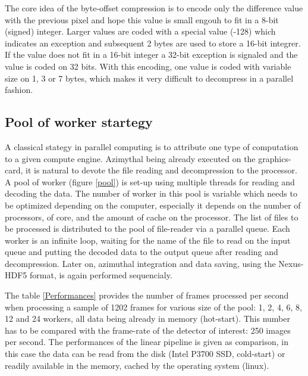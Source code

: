 \documentclass[preprint, pdf]{iucr}              %
\begin{document}
The core idea of the byte-offset compression is to encode only the difference
value with the previous pixel and hope this value is small engouh to fit in a
8-bit (signed) integer. 
Larger values are coded with a special value (-128) which indicates an exception
and subsequent 2 bytes are used to store a 16-bit integrer. 
If the value does not fit in a 16-bit integer a 32-bit exception is signaled and
the value is coded on 32 bits. 
With this encoding, one value is coded with variable size on 1, 3 or 7 bytes,
which makes it very difficult to decompress in a parallel fashion. 

\subsection{Pool of worker startegy} 

A classical stategy in parallel computing is to attribute one type of
computation to a given compute engine.
Azimythal being already executed on the graphics-card, it is natural to devote
the file reading and decompression to the processor.
A pool of worker (figure \ref{pool}) is set-up using multiple threads for
reading and decoding the data. 
The number of worker in this pool is variable which needs to be optimized 
depending on the computer, especially it depends on the number of processors,
of core, and the amount of cache on the processor.
The list of files to be processed is distributed to the pool of file-reader via
a parallel queue.
Each worker is an infinite loop, waiting for the name of the file to read 
on the input queue and putting the decoded data to the output queue after
reading and decompression.
Later on, azimuthal integration and data saving, using the Nexus-HDF5
format\cite{nexus}, is again performed sequencialy.

The table \ref{Performances} provides the number of frames processed per second
when processing a sample of 1202 frames for various size of the pool:
1, 2, 4, 6, 8, 12 and 24 workers, all data being already in memory (hot-start).
This number has to be compared with the frame-rate of the detector of interest:
250 images per second.
The performances of the linear pipeline is given as comparison, in this case the
data can be read from the disk (Intel P3700 SSD, cold-start) or readily
available in the memory, cached by the operating system (linux).
\end{document}
